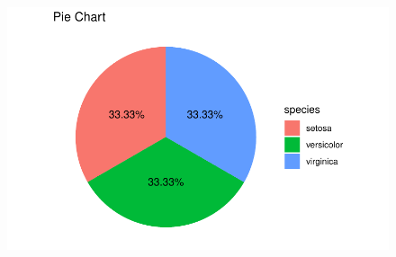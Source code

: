 \documentclass[
  letterpaper,
  DIV=11,
  numbers=noendperiod]{scrreprt}
\begin{document}
\begin{figure}[H]

{\centering \includegraphics{./visualizing-data_files/figure-pdf/unnamed-chunk-11-1.pdf}

}

\end{figure}
\end{document}
